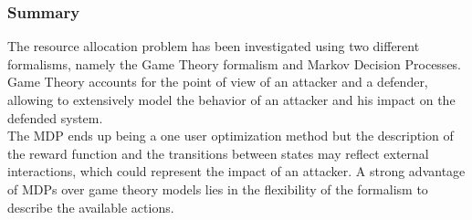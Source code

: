 
\subsubsection{Summary}
The resource allocation problem has been investigated using two different formalisms, namely the Game Theory formalism and Markov Decision Processes.
Game Theory accounts for the point of view of an attacker and a defender, allowing to extensively model the behavior of an attacker and his impact on the defended system.\\
The MDP ends up being a one user optimization method but the description of the reward function and the transitions between states may reflect external interactions, which could represent the impact of an attacker.
A strong advantage of MDPs over game theory models lies in the flexibility of the formalism to describe the available actions.


